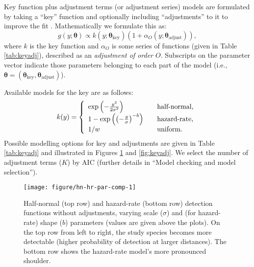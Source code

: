 \documentclass[article]{jss}\usepackage[]{graphicx}\usepackage[]{color}
\makeatletter
\def\maxwidth{ %
  \ifdim\Gin@nat@width>\linewidth
    \linewidth
  \else
    \Gin@nat@width
  \fi
}
\makeatother
\begin{document}
Key function plus adjustment terms (or adjustment series) models are formulated by taking a ``key'' function and optionally including ``adjustments'' to it to improve the fit \citep{Buckland:1992fa}. Mathematically we formulate this as:
$$
g(y; \boldsymbol{\theta}) \propto k(y; \boldsymbol{\theta}_\text{key})\left( 1+ \alpha_O(y; \boldsymbol{\theta}_\text{adjust})\right),
$$
where $k$ is the key function and $\alpha_O$ is some series of functions (given in Table \ref{tab:keyadj}), described as an \textit{adjustment of order $O$}. Subscripts on the parameter vector indicate those parameters belonging to each part of the model (i.e., $\boldsymbol{\theta} = (\boldsymbol{\theta}_\text{key}, \boldsymbol{\theta}_\text{adjust})$).

Available models for the key are as follows:
$$
k(y) = \left\{
\begin{array}{l l}
  \exp\left(-\frac{y^2}{2 \sigma^2}\right) & \quad \text{half-normal,} \\
  1-\exp\left(\left(-\frac{y}{\sigma}\right)^{-b}\right) & \quad \text{hazard-rate,} \\
  1/w & \quad \text{uniform.}
\end{array} \right.
$$
Possible modelling options for key and adjustments are given in Table \ref{tab:keyadj} and illustrated in Figures \ref{fig:hnhr} and \ref{fig:keyadj}. We select the number of adjustment terms ($K$) by AIC (further details in ``Model checking and model selection'').

\begin{figure}
\begin{center}
\begin{Schunk}

\texttt{[image: figure/hn-hr-par-comp-1]} \end{Schunk}
\caption{Half-normal (top row) and hazard-rate (bottom row) detection functions without adjustments, varying scale ($\sigma$) and (for hazard-rate) shape ($b$) parameters (values are given above the plots). On the top row from left to right, the study species becomes more detectable (higher probability of detection at larger distances). The bottom row shows the hazard-rate model's more pronounced shoulder.}
\label{fig:hnhr}
\end{center}
\end{figure}
\end{document}
